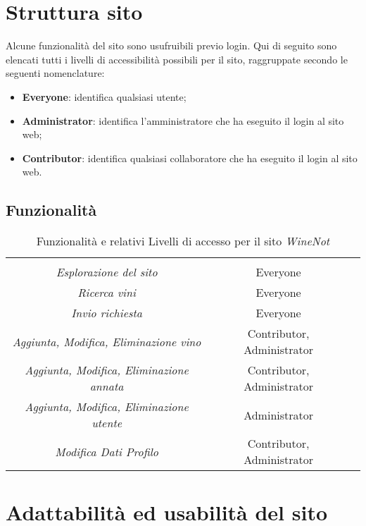 \section{Struttura sito}

Alcune funzionalità del sito sono usufruibili previo login. Qui di
seguito sono elencati tutti i livelli di accessibilità possibili per il sito, raggruppate secondo le seguenti nomenclature:
\begin{itemize}
	\item \textbf{Everyone}: identifica qualsiasi utente;
	\item \textbf{Administrator}: identifica l'amministratore che ha eseguito il login al sito web;
	\item \textbf{Contributor}: identifica qualsiasi collaboratore che ha eseguito il login al sito web.
\end{itemize}




\subsection{Funzionalità}

\begin{table}[H]
	\centering
	\begin{tabular}{c|c|C{4cm}}
		\rowcolorhead
		 &  \\
		\rowcolorlight
		\textit{Esplorazione del sito}  & Everyone \\
		\rowcolordark
		\textit{Ricerca vini}  & Everyone \\
		\rowcolorlight
		\textit{Invio richiesta}  & Everyone \\
		\rowcolordark
		\textit{Aggiunta, Modifica, Eliminazione vino}  & Contributor, Administrator \\
		\rowcolorlight
		\textit{Aggiunta, Modifica, Eliminazione annata}  & Contributor, Administrator \\
		\rowcolordark
		\textit{Aggiunta, Modifica, Eliminazione utente}  & Administrator \\
		\rowcolorlight
		\textit{Modifica Dati Profilo}  & Contributor, Administrator \\
		
	\end{tabular}
	\caption{Funzionalità e relativi Livelli di accesso per il sito \textit{WineNot}}
\end{table}


\section{Adattabilità ed usabilità del sito}

